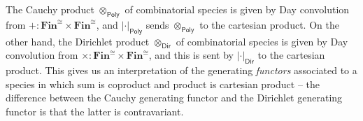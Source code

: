 \documentclass[11pt, article, one side]{memoir}
\theoremstyle{theorem}
\theoremstyle{definition}
\theoremstyle{remark}
\newcommand{\Cat}[1]{\mathsf{#1}}%
\newcommand{\poly}{\Cat{Poly}}
\newcommand{\dir}{\Cat{Dir}}
\begin{document}
The Cauchy product $\otimes_{\poly}$ of combinatorial species is given by Day
convolution from $+ : \textbf{Fin}^{\cong} \times \textbf{Fin}^{\cong}$, and
$|\cdot|_{\poly}$ sends $\otimes_{\poly}$ to the cartesian product. On the
other hand, the Dirichlet product $\otimes_{\dir}$ of combinatorial species is
given by Day convolution from $\times : \textbf{Fin}^{\cong} \times
\textbf{Fin}^{\cong}$, and this is sent by $|\cdot|_{\dir}$ to the cartesian
product. This gives us an interpretation of the generating \emph{functors}
associated to a species in which sum is coproduct and product is cartesian
product -- the difference between the Cauchy generating functor and the
Dirichlet generating functor is that the latter is contravariant.
\end{document}
